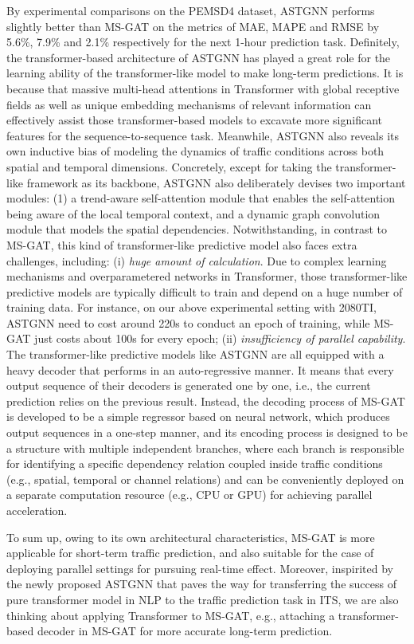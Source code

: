 By experimental comparisons on the PEMSD4 dataset, ASTGNN performs slightly better than MS-GAT on the metrics of MAE, MAPE and RMSE by 5.6\%, 7.9\% and 2.1\% respectively for the next 1-hour prediction task. Definitely, the transformer-based architecture of ASTGNN has played a great role for the learning ability of the transformer-like model to make long-term predictions. It is because that massive multi-head attentions in Transformer with global receptive fields as well as unique embedding mechanisms of relevant information can effectively assist those transformer-based models to excavate more significant features for the sequence-to-sequence task. Meanwhile, ASTGNN also reveals its own inductive bias of modeling the dynamics of traffic conditions across both spatial and temporal dimensions. Concretely, except for taking the transformer-like framework as its backbone, ASTGNN also deliberately devises two important modules: (1) a trend-aware self-attention module that enables the self-attention being aware of the local temporal context, and a dynamic graph convolution module that models the spatial dependencies. Notwithstanding, in contrast to MS-GAT, this kind of transformer-like predictive model also faces extra challenges, including: (i) \textit{huge amount of calculation}. Due to complex learning mechanisms and overparametered networks in Transformer, those transformer-like predictive models are typically difficult to train and depend on a huge number of training data. For instance, on our above experimental setting with 2080TI, ASTGNN need to cost around 220s to conduct an epoch of training, while MS-GAT just costs about 100s for every epoch; (ii) \textit{insufficiency of parallel capability}. The transformer-like predictive models like ASTGNN are all equipped with a heavy decoder that performs in an auto-regressive manner. It means that every output sequence of their decoders is generated one by one, i.e., the current prediction relies on the previous result. Instead, the decoding process of MS-GAT is developed to be a simple regressor based on neural network, which produces output sequences in a one-step manner, and its encoding process is designed to be a structure with multiple independent branches, where each branch is responsible for identifying a specific dependency relation coupled inside traffic conditions (e.g., spatial, temporal or channel relations) and can be conveniently deployed on a separate computation resource (e.g., CPU or GPU) for achieving parallel acceleration. 

To sum up, owing to its own architectural characteristics, MS-GAT is more applicable for short-term traffic prediction, and also suitable for the case of deploying parallel settings for pursuing real-time effect. Moreover, inspirited by the newly proposed ASTGNN that paves the way for transferring the success of pure transformer model in NLP to the traffic prediction task in ITS, we are also thinking about applying Transformer to MS-GAT, e.g., attaching a transformer-based decoder in MS-GAT for more accurate long-term prediction. 
